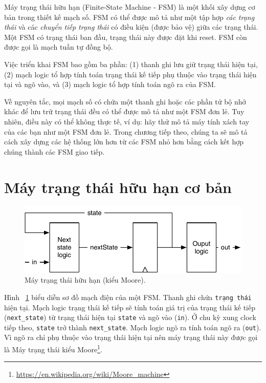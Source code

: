 \documentclass[%
    10pt,
    headinclude, footexclude,
    openright, %
    notitlepage,
    cleardoubleempty,
    headsepline,
    pointlessnumbers,
    bibtotoc, idxtotoc,
    ]{scrbook}
\newcommand{\code}[1]{{\small{\texttt{#1}}}}
\newcommand{\scale}{0.7}
\newcommand{\myref}[2]{\href{#1}{#2}}
\renewcommand{\myref}[2]{{#2}{\footnote{\url{#1}}}}
\begin{document}
Máy trạng thái hữu hạn (Finite-State Machine - FSM) là một khối xây dựng cơ bản trong thiết kế mạch số. FSM có thể được mô tả như một tập hợp \emph{các trạng thái} và các \emph{chuyển tiếp trạng thái} có điều kiện (được bảo vệ) giữa các trạng thái. Một FSM có trạng thái ban đầu, trạng thái này được đặt khi reset. FSM còn được gọi là mạch tuần tự đồng bộ.

Việc triển khai FSM bao gồm ba phần: (1) thanh ghi lưu giữ trạng thái hiện tại, (2) mạch logic tổ hợp tính toán trạng thái kế tiếp phụ thuộc vào trạng thái hiện tại và ngõ vào, và (3) mạch logic tổ hợp tính toán ngõ ra của FSM.

Về nguyên tắc, mọi mạch số có chứa một thanh ghi hoặc các phần tử bộ nhớ khác để lưu trữ trạng thái đều có thể được mô tả như một FSM đơn lẻ. Tuy nhiên, điều này có thể không thực tế, ví dụ: hãy thử mô tả máy tính xách tay của các bạn như một FSM đơn lẻ. Trong chương tiếp theo, chúng ta sẽ mô tả cách xây dựng các hệ thống lớn hơn từ các FSM nhỏ hơn bằng cách kết hợp chúng thành các FSM giao tiếp. 

\section{Máy trạng thái hữu hạn cơ bản}

\begin{figure}
  \centering
  \includegraphics[scale=\scale]{figures/fsm}
  \caption{Máy trạng thái hữu hạn (kiểu Moore).}
  \label{fig:fsm}
\end{figure}

Hình ~\ref{fig:fsm} biểu diễn sơ đồ mạch điện của một FSM. Thanh ghi chứa \code{trạng thái} hiện tại.
Mạch logic trạng thái kế tiếp sẽ tính toán giá trị của trạng thái kế tiếp (\code{next\_state}) từ trạng thái hiện tại \code{state} và ngõ vào (\code{in}).
Ở chu kỳ xung clock tiếp theo, \code{state} trở thành \code{next\_state}.
Mạch logic ngõ ra tính toán ngõ ra (\code{out}). Vì ngõ ra chỉ phụ thuộc vào trạng thái hiện tại nên máy trạng thái này được gọi là
\myref{https://en.wikipedia.org/wiki/Moore_machine}{Máy trạng thái kiểu Moore}.
\end{document}
